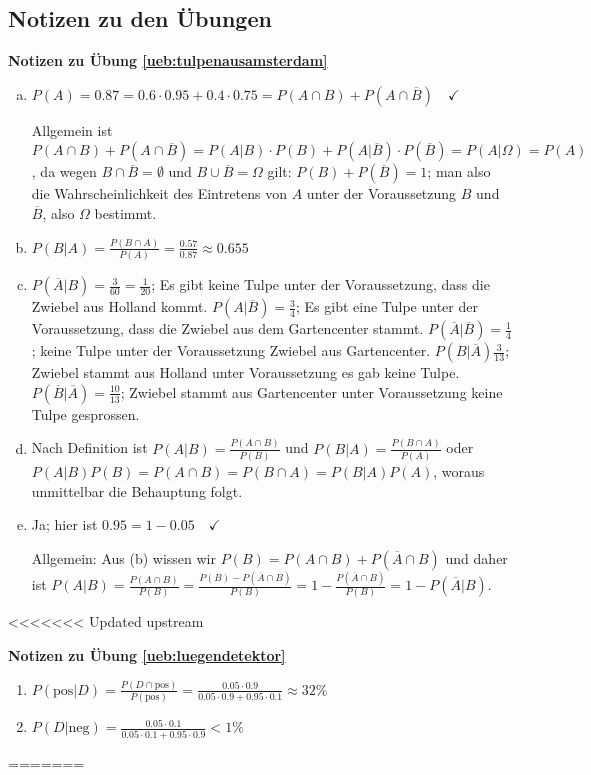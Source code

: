 \documentclass[%
<<<<<<< Updated upstream
11pt,%
twoside,%
titlepage,%
german,%
=======
11pt,%
twoside,%
titlepage,%
swissgerman,%
>>>>>>> Stashed changes
headsepline%
]{scrartcl}
\newcommand{\faReturnGray}{\textcolor{gray}{\faMailReply}} %
\theoremstyle{definition}
\theoremstyle{plain}
\newcommand{\concatueb}[1]{ueb:#1}%
\newcommand{\concatlsg}[1]{lsg:#1}%
\newenvironment{lsg}[1]{%
    \par\noindent\textbf{Notizen zu Übung \ref{\concatueb{#1}}}\label{\concatlsg{#1}}
    \hfill\hyperref[\concatueb{#1}]{\faReturnGray}\par %
}{%
    \par%
}
\newcommand{\concatueb}[1]{ueb:#1}%
\newcommand{\concatlsg}[1]{lsg:#1}%
\newenvironment{lsg}[1]{%
    \par\noindent\textbf{Notizen zu Übung \ref{\concatueb{#1}}.}%
    \label{\concatlsg{#1}}
}{%
    \par%
}
\begin{document}
\clearpage

\subsection{Notizen zu den Übungen}

\begin{lsg}{tulpenausamsterdam}
    \begin{enumerate}[a)]
        \item $P(A)=0.87=0.6\cdot0.95+0.4\cdot0.75=P(A\cap B)+P(A\cap\overline{B})\quad\checkmark$
        
        Allgemein ist $P(A\cap B)+P(A\cap\overline{B})=P(A|B)\cdot P(B)+P(A|\overline{B})\cdot P(\overline{B})=P(A|\Omega)=P(A)$, da wegen $B\cap\overline{B}=\emptyset$ und $B\cup\overline{B}=\Omega$ gilt: $P(B)+P(\overline{B})=1$; man also die Wahrscheinlichkeit des Eintretens von $A$ unter der Voraussetzung $B$ und $\overline{B}$, also $\Omega$ bestimmt.
        \item $P(B|A)=\frac{P(B\cap A)}{P(A)}=\frac{0.57}{0.87}\approx0.655$
        \item $P(\overline{A}|B)=\frac{3}{60}=\frac{1}{20}$; Es gibt keine Tulpe unter der Voraussetzung, dass die Zwiebel aus Holland kommt. $P(A|\overline{B})=\frac{3}{4}$; Es gibt eine Tulpe unter der Voraussetzung, dass die Zwiebel aus dem Gartencenter stammt. $P(\overline{A}|\overline{B})=\frac{1}{4}$; keine Tulpe unter der Voraussetzung Zwiebel aus Gartencenter. $P(B|\overline{A})\frac{3}{13}$; Zwiebel stammt aus Holland unter Voraussetzung es gab keine Tulpe. $P(\overline{B}|\overline{A})=\frac{10}{13}$; Zwiebel stammt aus Gartencenter unter Voraussetzung keine Tulpe gesprossen.
        \item Nach Definition ist $P(A|B)=\frac{P(A\cap B)}{P(B)}$ und $P(B|A)=\frac{P(B\cap A)}{P(A)}$ oder $P(A|B)P(B)=P(A\cap B)=P(B\cap A)=P(B|A)P(A)$, woraus unmittelbar die Behauptung folgt.
        \item Ja; hier ist $0.95=1-0.05\quad\checkmark$
        
        Allgemein: Aus (b) wissen wir $P(B)=P(A\cap B)+P(\overline{A}\cap B)$ und daher ist $P(A|B)=\frac{P(A\cap B)}{P(B)}=\frac{P(B)-P(\overline{A}\cap B)}{P(B)}=1-\frac{P(\overline{A}\cap B)}{P(B)}=1-P(\overline{A}|B)$.
    \end{enumerate}
\end{lsg}
<<<<<<< Updated upstream
\begin{lsg}{luegendetektor}
    \begin{enumerate}
        \item $P(\text{pos}|D)=\frac{P(D\cap\text{pos})}{P(\text{pos})}=\frac{0.05\cdot 0.9}{0.05\cdot0.9+0.95\cdot0.1}\approx32\%$
        \item $P(D|\text{neg})=\frac{0.05\cdot0.1}{0.05\cdot0.1+0.95\cdot0.9}<1\%$
    \end{enumerate}
\end{lsg}
=======
\end{document}
